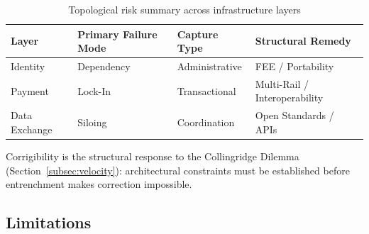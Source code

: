 \documentclass{article}
\begin{document}
\begin{table}[htbp]
\centering
\caption{Topological risk summary across infrastructure layers}
\label{tab:topological-risk}
\begin{tabular}{llll}
\toprule
\textbf{Layer} & \textbf{Primary Failure Mode} & \textbf{Capture Type} & \textbf{Structural Remedy} \\
\midrule
Identity & Dependency & Administrative & FEE / Portability \\
Payment & Lock-In & Transactional & Multi-Rail / Interoperability \\
Data Exchange & Siloing & Coordination & Open Standards / APIs \\
\bottomrule
\end{tabular}
\end{table}

Corrigibility is the structural response to the Collingridge Dilemma (Section~\ref{subsec:velocity}): architectural constraints must be established before entrenchment makes correction impossible.

\subsection{Limitations}
\end{document}
